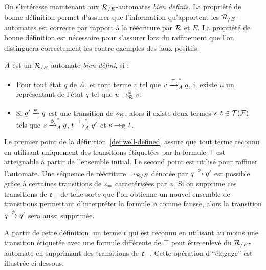 On s'intéresse maintenant aux ${\mathcal R_{/E}}$-automates {\em bien définis}. 
La propriété de bonne définition permet d'assurer que l'information
qu'apportent les ${\mathcal R_{/E}}$-automates est correcte par rapport à la réécriture
par $\mathcal R$ et $E$. La propriété de bonne définition est nécessaire pour s'assurer 
lors du raffinement que l'on distinguera correctement les contre-exemples des faux-positifs.


\begin{definition}
  \label{def:well-defined}
  $\mathit A$ est un ${\mathcal R_{/E}}$-automate \emph{bien défini}, si :
  \begin{itemize}
  \item Pour tout état $q$ de $\mathit A$, et tout terme $v$ tel que
    $v \xrightarrow{\top}^*_\mathit A q$, il existe $u$ un représentant de l'état $q$ tel que $u \rightarrow^*_\mathcal R v$;
  \item Si $q' \xrightarrow{\phi} q$ est une transition de $\upvarepsilon_{\mathcal R}$, alors il existe deux termes
    $s,t\in \mathcal{T(F)}$ tels que $s\xrightarrow{\phi}^*_\mathit A q$, $t\xrightarrow{\top}^*_\mathit A q'$
    et $s \rightarrow_\mathcal R t$.
  \end{itemize}
\end{definition}

\noindent
Le premier point de la définition~\ref{def:well-defined} assure que
tout terme reconnu en utilisant uniquement des transitions étiquetées
par la formule $\top$ est atteignable à partir de l'ensemble initial.
Le second point est utilisé pour raffiner l'automate. Une séquence de réécriture
$\rightarrow_{\mathcal R/E}$ dénotée par $q \xrightarrow{\phi} q'$ est possible grâce à certaines transitions
de $\upvarepsilon_{=}$ caractérisées par $\phi$. Si on supprime ces transitions de $\upvarepsilon_{=}$ de telle sorte
que l'on obtienne un nouvel ensemble de transitions permettant d'interpréter la formule $\phi$ comme fausse,
alors la transition $q \xrightarrow{\phi} q'$ sera aussi supprimée.

A partir de cette définition, un terme $t$ qui est reconnu en 
utilisant au moins une transition étiquetée avec une formule différente de $\top$
peut être enlevé du ${\mathcal R_{/E}}$-automate en supprimant des transitions de $\upvarepsilon_{=}$.
Cette opération d'``élagage''  est illustrée ci-dessous.

